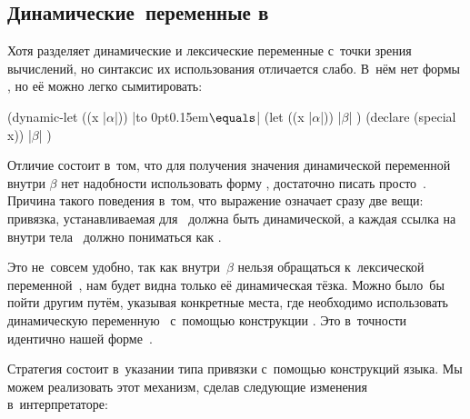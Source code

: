 \subsection{Динамические~переменные в~{\CommonLisp}}%
\label{lisp1-2-omega/namespaces/ssect:dyn-vars-cl}

Хотя {\CommonLisp} разделяет динамические и лексические переменные с~точки
зрения вычислений, но синтаксис их использования отличается слабо. В~нём нет
формы , но её можно легко сымитировать:

{\def\E{\hbox to 0pt{\kern0.15em$\equals$}}
\begin{code:lisp}
(dynamic-let ((x |$\alpha$|)) |\E|   (let ((x |$\alpha$|))
  |$\beta$| )                     (declare (special x))
                          |$\beta$| )
\end{code:lisp}}

Отличие состоит в~том, что для получения значения динамической переменной~
внутри $\beta$ нет надобности использовать форму , достаточно писать
просто~. Причина такого поведения в~том, что выражение  означает сразу две вещи: привязка, устанавливаемая 
для~ должна быть динамической, а каждая ссылка на~ внутри
тела~ должно пониматься как .

Это не~совсем удобно, так как внутри~$\beta$ нельзя обращаться к~лексической
переменной~, нам будет видна только её динамическая тёзка. Можно было~бы
пойти другим путём, указывая конкретные места, где необходимо использовать
динамическую переменную~ с~помощью конструкции . Это в~точности идентично нашей форме~.

Стратегия {\CommonLisp} состоит в~указании типа привязки с~помощью конструкций
языка. Мы можем реализовать этот механизм, сделав следующие изменения
в~интерпретаторе:

